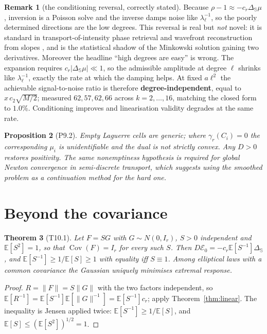 \documentclass[11pt]{article}
\newtheorem{theorem}{Theorem}[section]
\newtheorem{proposition}[theorem]{Proposition}
\theoremstyle{definition}
\newtheorem{remark}[theorem]{Remark}
\newcommand{\E}{\mathbb{E}}
\newcommand{\Sph}{\mathbb{S}}
\newcommand{\Lap}{\Delta_{\Sph}}
\begin{document}
\begin{remark}[the conditioning reversal, correctly stated]
Because $\rho-1\approx-c_{r}\Lap\mu$, inversion is a Poisson solve and the
inverse damps noise like $\lambda_{\ell}^{-1}$, so the poorly determined
directions are the low degrees. This reversal is real but \emph{not} novel: it
is standard in transport-of-intensity phase retrieval and wavefront
reconstruction from slopes \cite{Zuo}, and is the statistical shadow of the
Minkowski solution gaining two derivatives. Moreover the headline
``high degrees are easy'' is wrong. The expansion requires
$c_{r}\lvert\Lap\mu\rvert\ll1$, so the admissible amplitude at degree $\ell$
shrinks like $\lambda_{\ell}^{-1}$, exactly the rate at which the damping
helps. At fixed $a\ell^{2}$ the achievable signal-to-noise ratio is therefore
\textbf{degree-independent}, equal to $x\,c_{2}\sqrt{M/2}$; measured
$62,57,62,66$ across $k=2,\dots,16$, matching the closed form to $1.0\%$.
Conditioning improves and linearisation validity degrades at the same rate.
\end{remark}

\begin{proposition}[\textsf{P9.2}]\label{prop:ident}
Empty Laguerre cells are generic; where $\gamma_{r}(C_{i})=0$ the corresponding
$\mu_{i}$ is unidentifiable and the dual is not strictly convex. Any $D>0$
restores positivity. The same nonemptiness hypothesis is required for global
Newton convergence in semi-discrete transport, which suggests using the
smoothed problem as a continuation method for the hard one.
\end{proposition}

\section{Beyond the covariance}\label{sec:mixture}

\begin{theorem}[\textsf{T10.1}]\label{thm:mixture}
Let $F=SG$ with $G\sim N(0,I_{r})$, $S>0$ independent and $\E[S^{2}]=1$, so
that $\operatorname{Cov}(F)=I_{r}$ for every such $S$. Then
$D\mathcal{E}_{0}=-c_{r}\E[S^{-1}]\Lap$, and $\E[S^{-1}]\ge1/\E[S]\ge1$ with
equality iff $S\equiv1$. Among elliptical laws with a common covariance the
Gaussian uniquely \emph{minimises} extremal response.
\end{theorem}
\begin{proof}
$R=\lVert F\rVert=S\lVert G\rVert$ with the two factors independent, so
$\E[R^{-1}]=\E[S^{-1}]\E[\lVert G\rVert^{-1}]=\E[S^{-1}]c_{r}$; apply
Theorem~\ref{thm:linear}. The inequality is Jensen applied twice:
$\E[S^{-1}]\ge1/\E[S]$, and $\E[S]\le(\E[S^{2}])^{1/2}=1$.
\end{proof}
\end{document}
